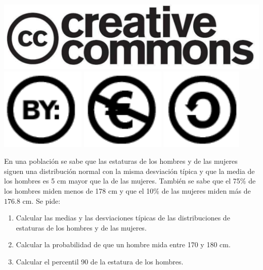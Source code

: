 \documentclass[aspectratio=149,10pt,xcolor=dvipsnames,t]{beamer}
\begin{document}
\begin{frame}[c]
\begin{center}
\biskip
\includegraphics[scale=0.07]{img/cc-logo}
\includegraphics[scale=0.2]{img/cc-by}
\includegraphics[scale=0.2]{img/cc-e}
\includegraphics[scale=0.2]{img/cc-c}
\end{center}
\end{frame}

\begin{frame}[c]
En una población se sabe que las estaturas de los hombres y de las mujeres siguen una distribución
normal con la misma desviación típica y que la media de los hombres es 5 cm mayor que la de las mujeres. 
También se sabe que el 75\% de los hombres miden menos de 178 cm y que el 10\% de las mujeres miden más de $176.8$ cm. 
Se pide:
\begin{enumerate}
\item Calcular las medias y las desviaciones típicas de las distribuciones de estaturas de los hombres y de las mujeres.
\item Calcular la probabilidad de que un hombre mida entre 170 y 180 cm.
\item Calcular el percentil 90 de la estatura de los hombres. 
\end{enumerate}
\end{frame}
\end{document}

